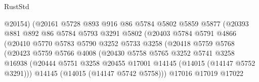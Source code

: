 \begin{lexlean}{RustStd}
\begin{coremodule}
                                  @20154)
                                (@20161
                                  @5728
                                  @893
                                  @916
                                  @86
                                  @5784
                                  @5802
                                  @5859
                                  @5877
                                  (@20393
                                    @881
                                    @892
                                    @86
                                    @5784
                                    @5793
                                    @3291
                                    @5802
                                    (@20403
                                      @5784
                                      @5791
                                      @4866
                                      (@20410
                                        @5770
                                        @5783
                                        @5790
                                        @3252
                                        @5733
                                        @3258
                                        (@20418
                                          @5759
                                          @5768
                                          (@20423
                                            @5759
                                            @5766
                                            @4008
                                            (@20430
                                              @5758
                                              @5765
                                              @3252
                                              @5741
                                              @3258
                                              @16938
                                              (@20444
                                                @5751
                                                @3258
                                                @20455
                                                @17001
                                                @14145
                                                (@14015 (@14147 @5752 @3291)))
                                              @14145
                                              (@14015 (@14147 @5742 @5758)))
                                            @17016
                                            @17019
                                            @17022

\end{coremodule}
\end{lexlean}
